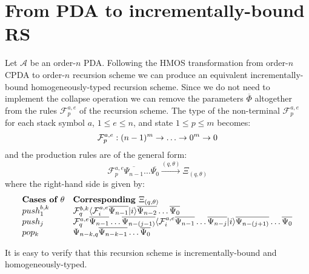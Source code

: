 \documentclass[a4paper,draft]{article}[12pt]
\theoremstyle{remark}
\theoremstyle{definition}
\begin{document}
\section{From PDA to incrementally-bound RS}
Let $\mathcal{A}$ be an order-$n$ PDA. Following the HMOS transformation from order-$n$ CPDA to order-$n$ recursion scheme \cite{hmos-lics08} we can produce an equivalent incrementally-bound homogeneously-typed recursion scheme.  Since we do not need to implement the collapse operation we can remove the parameters $\overline\Phi$ altogether from the rules $\mathcal{F}_p^{a,e}$ of the recursion scheme.
The type of the non-terminal $\mathcal{F}_p^{a,e}$  for each stack symbol $a$, $1\leq e \leq n$, and state $1\leq p \leq m$
 becomes:
 $$ \mathcal{F}_p^{a,e} : (n-1)^m \rightarrow \ldots \rightarrow 0^m \rightarrow 0$$
and the production rules are of the general form:
 $$ \mathcal{F}_p^{a,e} \overline{\Psi_{n-1}} \ldots \overline{\Psi_0} \stackrel{(q,\theta)}\rightarrow \Xi_{(q,\theta)}$$
 where the right-hand side is given by:
$$\begin{array}{ll}
\mbox{\bf Cases of $\theta$} & \mbox{\bf Corresponding } \Xi_{(q,\theta)} \\
push_1^{b,k} & \mathcal{F}_q^{b,k} \langle \mathcal{F}_i^{a,e} \overline{\Psi_{n-1}} | i \rangle \overline{\Psi_{n-2}} \ldots
 \overline{\Psi_0} \\
push_j & \mathcal{F}_q^{a,e} \overline{\Psi_{n-1}} \ldots \overline{\Psi_{n-(j-1)}}\langle \mathcal{F}_i^{a,e} \overline{\Psi_{n-1}} \ldots \overline{\Psi_{n-j}} | i \rangle \overline{\Psi_{n-(j+1)}} \ldots
 \overline{\Psi_0} \\
pop_k & \Psi_{n-k,q} \overline{\Psi_{n-k-1}} \ldots \overline{\Psi_{0}}
 \end{array}
 $$

It is easy to verify that this recursion scheme is incrementally-bound and homogeneously-typed.



\end{document}
